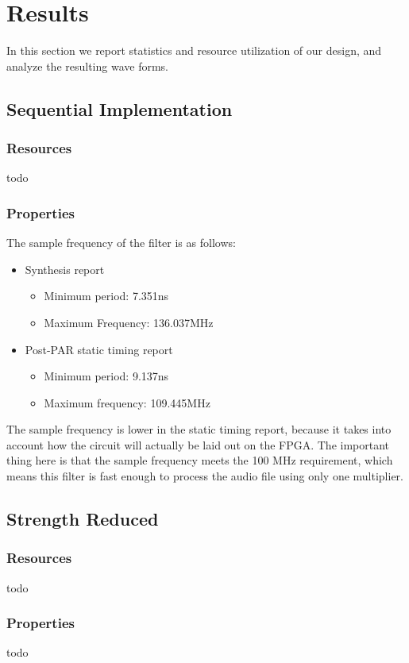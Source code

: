 \section{Results}
In this section we report statistics and resource utilization of our design, and analyze the resulting wave forms.
\subsection{Sequential Implementation}
\subsubsection{Resources}
todo
\subsubsection{Properties}
The sample frequency of the filter is as follows:
\begin{itemize}
\item
Synthesis report
\begin{itemize}
\item Minimum period: 7.351ns
\item Maximum Frequency: 136.037MHz
\end{itemize}
\item
Post-PAR static timing report
\begin{itemize}
\item  Minimum period:   9.137ns  
\item Maximum frequency: 109.445MHz
\end{itemize}
\end{itemize}
The sample frequency is lower in the static timing report, because it takes into account how the circuit will actually be laid out on the FPGA. The important thing here is that the sample frequency meets the 100 MHz requirement, which means this filter is fast enough to process the audio file using only one multiplier.
\subsection{Strength Reduced}
\subsubsection{Resources}
todo
\subsubsection{Properties}
todo
